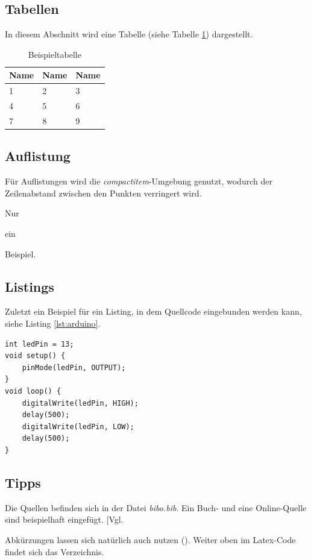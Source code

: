 \documentclass[12pt,a4paper,bibliography=totocnumbered,listof=totocnumbered]{scrartcl}
\begin{document}
\subsection{Tabellen}
In diesem Abschnitt wird eine Tabelle (siehe Tabelle \ref{tab:beispiel}) dargestellt.

\vspace{1em}
\begin{table}[!h]
	\centering
	\begin{tabular}{|l|l|l|}
		\hline
		\textbf{Name} & \textbf{Name} & \textbf{Name}\\
		\hline
		1 & 2 & 3\\
		\hline
		4 & 5 & 6\\
		\hline
		7 & 8 & 9\\
		\hline
	\end{tabular}
	\caption{Beispieltabelle}
	\label{tab:beispiel}
\end{table}

\pagebreak
\subsection{Auflistung}
Für Auflistungen wird die \textit{compactitem}-Umgebung genutzt, wodurch der Zeilenabstand zwischen den Punkten verringert wird.

\begin{compactitem}
	\item Nur
	\item ein
	\item Beispiel.
\end{compactitem}

\subsection{Listings}
Zuletzt ein Beispiel für ein Listing, in dem Quellcode eingebunden werden kann, siehe Listing \ref{lst:arduino}.

\vspace{1em}
\begin{lstlisting}[caption=Arduino Beispielprogramm, label=lst:arduino]
int ledPin = 13;
void setup() {
    pinMode(ledPin, OUTPUT);
}
void loop() {
    digitalWrite(ledPin, HIGH);
    delay(500);
    digitalWrite(ledPin, LOW);
    delay(500);
}
\end{lstlisting}

\subsection{Tipps}
Die Quellen befinden sich in der Datei \textit{bibo.bib}. Ein Buch- und eine Online-Quelle sind beispielhaft eingefügt. [Vgl. %

Abkürzungen lassen sich natürlich auch nutzen (). Weiter oben im Latex-Code findet sich das Verzeichnis.
\pagebreak
\end{document}
